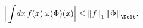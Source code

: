 \begin{equation} \label{lift}
\Big|\int \! dx \, f(x) \, \omega (\Phi) (x) \Big|
\leq {\| f \|}_1 \, {\| \Phi \|}_\Delt,
\end{equation}

